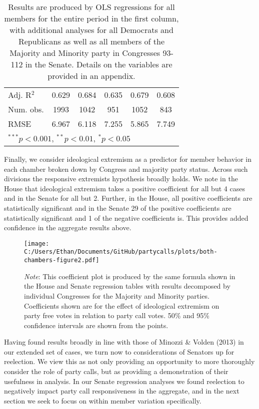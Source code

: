 \documentclass[12pt]{article}
\newcommand\fnote[1]{\captionsetup{font=small}\caption*{#1}}
\begin{document}
\begin{table}[H]
\begin{center}
\begin{tabular}{l c c c c c }
			Adj. R$^2$             & 0.629          & 0.684         & 0.635          & 0.679          & 0.608         \\
			Num. obs.              & 1993           & 1042          & 951            & 1052           & 843           \\
			RMSE                   & 6.967          & 6.118         & 7.255          & 5.865          & 7.749         \\
			\hline
			\multicolumn{6}{l}{\scriptsize{$^{***}p<0.001$, $^{**}p<0.01$, $^*p<0.05$}}
		\end{tabular}
		\fnote{Results are produced by OLS regressions for all members for the entire period in the first column, with additional analyses for all Democrats and Republicans as well as all members of the Majority and Minority party in Congresses 93-112 in the Senate. Details on the variables are provided in an appendix.}
	\end{center}
\end{table}

Finally, we consider ideological extremism as a predictor for member behavior in each chamber broken down by Congress and majority party status. Across such divisions the responsive extremists hypothesis broadly holds. We note in the House that ideological extremism takes a positive coefficient for all but 4 cases and in the Senate for all but 2. Further, in the House, all positive coefficients are statistically significant and in the Senate 29 of the positive coefficients are statistically significant and 1 of the negative coefficients is. This provides added confidence in the aggregate results above.

\begin{figure}[H]
	\centering
	\caption{Ideology and Responsiveness to Party Calls, Congresses 93-112}
	\texttt{[image: C:/Users/Ethan/Documents/GitHub/partycalls/plots/both-chambers-figure2.pdf]}
	\fnote{\textit{Note}: This coefficient plot is produced by the same formula shown in the House and Senate regression tables with results decomposed by individual Congresses for the Majority and Minority parties. Coefficients shown are for the effect of ideological extremism on party free votes in relation to party call votes. 50\% and 95\% confidence intervals are shown from the points.}
\end{figure} 

Having found results broadly in line with those of Minozzi \& Volden (2013) in our extended set of cases, we turn now to considerations of Senators up for reelection. We view this as not only providing an opportunity to more thoroughly consider the role of party calls, but as providing a demonstration of their usefulness in analysis. In our Senate regression analyses we found reelection to negatively impact party call responsiveness in the aggregate, and in the next section we seek to focus on within member variation specifically. 
\end{document}

